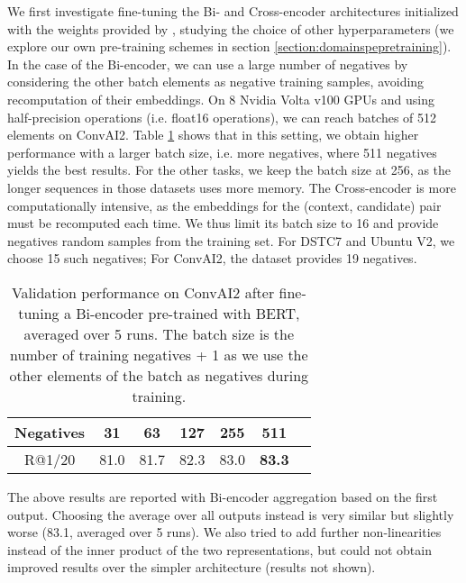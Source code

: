 \documentclass{article} \usepackage{iclr2020_conference,times}
\begin{document}
We first investigate fine-tuning the Bi- and Cross-encoder architectures initialized with the weights provided by \citet{devlin-etal-2019-bert}, studying the choice of other hyperparameters (we explore our own pre-training schemes in section \ref{section:domainspepretraining}). In the case of the Bi-encoder, we can use a large number of negatives by considering the other batch elements as negative training samples, avoiding recomputation of their embeddings. On 8 Nvidia Volta v100 GPUs and using half-precision operations (i.e. float16 operations), we can reach batches of 512 elements on ConvAI2. Table \ref{table:negs_bi} shows that in this setting, we obtain higher performance with a larger batch size, i.e. more negatives, where 511 negatives yields the best results. For the other tasks, we keep the batch size at 256, as the longer sequences in those datasets uses more memory.
The Cross-encoder is more computationally intensive, as the embeddings for the (context, candidate) pair must be recomputed each time. We thus limit its batch size to 16 and provide negatives random samples from the training set. For DSTC7 and Ubuntu V2, we choose 15 such negatives; For ConvAI2, the dataset provides 19 negatives.
\begin{table}[h]
\center
\begin{tabular}{|c|c|c|c|c|c|c|}
\hline
Negatives & 31 & 63 & 127 & 255 & 511\\
\hline
R@1/20 & 81.0 & 81.7 & 82.3 & 83.0 & \textbf{83.3} \\

\hline
\end{tabular}
\caption{Validation performance  on ConvAI2 after fine-tuning a Bi-encoder pre-trained with BERT, averaged over 5 runs. The batch size is the number of training negatives + 1 as we use the other elements of the batch as negatives during training. }
\label{table:negs_bi}
\vspace{-0.5em}
\end{table}

The above results are reported with Bi-encoder aggregation based on the first output. Choosing the average over all outputs instead is very similar but slightly worse (83.1, averaged over 5 runs).
We also tried to add further non-linearities instead of the inner product of the two representations, but could not obtain improved results over the simpler architecture (results not shown).
\end{document}
